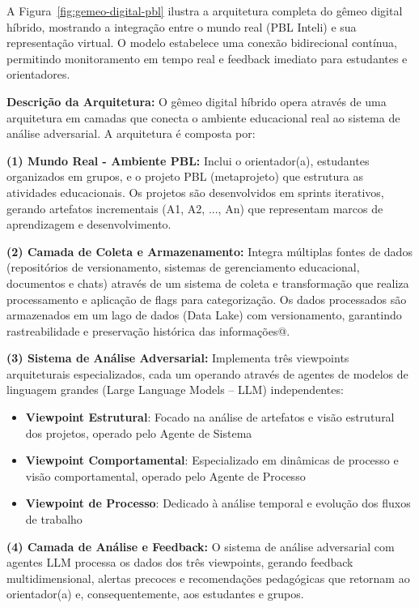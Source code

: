 \documentclass[english, spanish, brazilian]{modelo_dt}
\begin{document}
A Figura~\ref{fig:gemeo-digital-pbl} ilustra a arquitetura completa do gêmeo digital híbrido, mostrando a integração entre o mundo real (PBL Inteli) e sua representação virtual. O modelo estabelece uma conexão bidirecional contínua, permitindo monitoramento em tempo real e feedback imediato para estudantes e orientadores\@.

\textbf{Descrição da Arquitetura:} O gêmeo digital híbrido opera através de uma arquitetura em camadas que conecta o ambiente educacional real ao sistema de análise adversarial. A arquitetura é composta por:

\textbf{(1) Mundo Real - Ambiente PBL:} Inclui o orientador(a), estudantes organizados em grupos, e o projeto PBL (metaprojeto) que estrutura as atividades educacionais. Os projetos são desenvolvidos em sprints iterativos, gerando artefatos incrementais (A1, A2, ..., An) que representam marcos de aprendizagem e desenvolvimento\@.

\textbf{(2) Camada de Coleta e Armazenamento:} Integra múltiplas fontes de dados (repositórios de versionamento, sistemas de gerenciamento educacional, documentos e chats) através de um sistema de coleta e transformação que realiza processamento e aplicação de flags para categorização. Os dados processados são armazenados em um lago de dados (Data Lake) com versionamento, garantindo rastreabilidade e preservação histórica das informações@.

\textbf{(3) Sistema de Análise Adversarial:} Implementa três viewpoints arquiteturais especializados, cada um operando através de agentes de modelos de linguagem grandes (Large Language Models -- LLM) independentes:
\begin{itemize}
\item \textbf{Viewpoint Estrutural}: Focado na análise de artefatos e visão estrutural dos projetos, operado pelo Agente de Sistema
\item \textbf{Viewpoint Comportamental}: Especializado em dinâmicas de processo e visão comportamental, operado pelo Agente de Processo
\item \textbf{Viewpoint de Processo}: Dedicado à análise temporal e evolução dos fluxos de trabalho
\end{itemize}

\textbf{(4) Camada de Análise e Feedback:} O sistema de análise adversarial com agentes LLM processa os dados dos três viewpoints, gerando feedback multidimensional, alertas precoces e recomendações pedagógicas que retornam ao orientador(a) e, consequentemente, aos estudantes e grupos\@.
\end{document}
